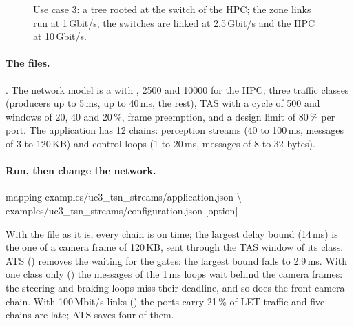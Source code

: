 \begin{figure}[ht]
\centering
{}
\caption{Use case 3: a tree rooted at the switch of the HPC; the zone
links run at 1\,Gbit/s, the switches are linked at 2.5\,Gbit/s and the
HPC at 10\,Gbit/s.}
\label{fig:uc3}
\end{figure}

\paragraph{The files.} . The network
model is a  with  ,
 2500 and  10000 for the HPC;
three traffic classes (producers up to 5\,ms, up to 40\,ms, the rest), TAS
with a cycle of 500\us{} and windows of 20, 40 and 20\,\%, frame
preemption, and a design limit of 80\,\% per port. The application has 12
chains: perception streams (40 to 100\,ms, messages of 3 to 120\,KB) and
control loops (1 to 20\,ms, messages of 8 to 32 bytes).

\paragraph{Run, then change the network.}
\begin{shell}
mapping examples/uc3\_tsn\_streams/application.json \textbackslash\\
\quad examples/uc3\_tsn\_streams/configuration.json [option]
\end{shell}
With the file as it is, every chain is on time; the largest delay bound
(14\,ms) is the one of a camera frame of 120\,KB, sent through the TAS
window of its class. ATS () removes the waiting for the gates:
the largest bound falls to 2.9\,ms. With one class only
() the messages of the 1\,ms loops wait behind the camera
frames: the steering and braking loops miss their deadline, and so does
the front camera chain. With 100\,Mbit/s links
() the ports carry 21\,\% of LET traffic and five chains are
late; ATS saves four of them.

